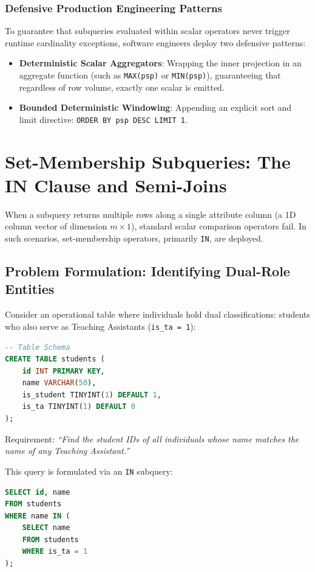 \documentclass[10pt,twocolumn,letterpaper]{article}
\begin{document}
\subsubsection{Defensive Production Engineering Patterns}
To guarantee that subqueries evaluated within scalar operators never trigger runtime cardinality exceptions, software engineers deploy two defensive patterns:
\begin{itemize}
    \item \textbf{Deterministic Scalar Aggregators}: Wrapping the inner projection in an aggregate function (such as \texttt{MAX(psp)} or \texttt{MIN(psp)}), guaranteeing that regardless of row volume, exactly one scalar is emitted.
    \item \textbf{Bounded Deterministic Windowing}: Appending an explicit sort and limit directive: \texttt{ORDER BY psp DESC LIMIT 1}.
\end{itemize}

\section{Set-Membership Subqueries: The IN Clause and Semi-Joins}
\label{sec:in_subqueries}

When a subquery returns multiple rows along a single attribute column (a 1D column vector of dimension $m \times 1$), standard scalar comparison operators fail. In such scenarios, set-membership operators, primarily \texttt{IN}, are deployed.

\subsection{Problem Formulation: Identifying Dual-Role Entities}
Consider an operational table where individuals hold dual classifications: students who also serve as Teaching Assistants (\texttt{is\_ta = 1}):
\begin{lstlisting}[language=SQL]
-- Table Schema
CREATE TABLE students (
    id INT PRIMARY KEY,
    name VARCHAR(50),
    is_student TINYINT(1) DEFAULT 1,
    is_ta TINYINT(1) DEFAULT 0
);
\end{lstlisting}

Requirement: \textit{``Find the student IDs of all individuals whose name matches the name of any Teaching Assistant.''}

This query is formulated via an \texttt{IN} subquery:
\begin{lstlisting}[language=SQL]
SELECT id, name
FROM students
WHERE name IN (
    SELECT name 
    FROM students 
    WHERE is_ta = 1
);
\end{lstlisting}
\end{document}
